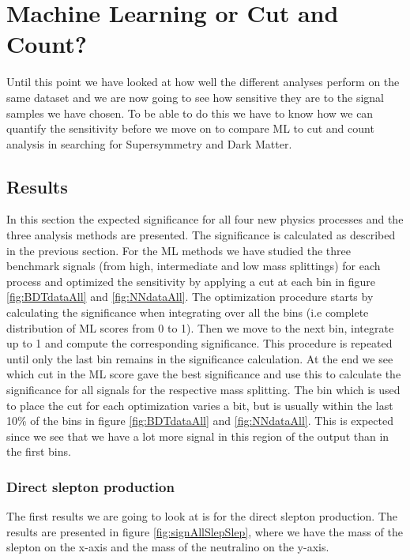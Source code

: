 \chapter{Machine Learning or Cut and Count?}
\label{sec:results}
Until this point we have looked at how well the different analyses perform on the same dataset and we are now going to see how sensitive they are to the signal samples we have chosen. To be able to do this we have to know how we can quantify the sensitivity before we move on to compare ML to cut and count analysis in searching for Supersymmetry and Dark Matter. 
%
%

%





\section{Results}
In this section the expected significance for all four new physics processes and the three analysis methods are presented. The significance is calculated as described in the previous section. For the ML methods we have studied the three benchmark signals (from high, intermediate and low mass splittings) for each process and optimized the sensitivity by applying a cut at each bin in figure \ref{fig:BDTdataAll} and \ref{fig:NNdataAll}. The optimization procedure starts by calculating the significance when integrating over all the bins (i.e complete distribution of ML scores from 0 to 1). Then we move to the next bin, integrate up to 1 and compute the corresponding significance. This procedure is repeated until only the last bin remains in the significance calculation. At the end we see which cut in the ML score gave the best significance and use this to calculate the significance for all signals for the respective mass splitting. The bin which is used to place the cut for each optimization varies a bit, but is usually within the last 10\% of the bins in figure \ref{fig:BDTdataAll} and \ref{fig:NNdataAll}. This is expected since we see that we have a lot more signal in this region of the output than in the first bins. 

\subsection{Direct slepton production}
\label{sec:resSlepSlep}
The first results we are going to look at is for the direct slepton production. The results are presented in figure \ref{fig:signAllSlepSlep}, where we have the mass of the slepton on the x-axis and the mass of the neutralino on the y-axis. 

